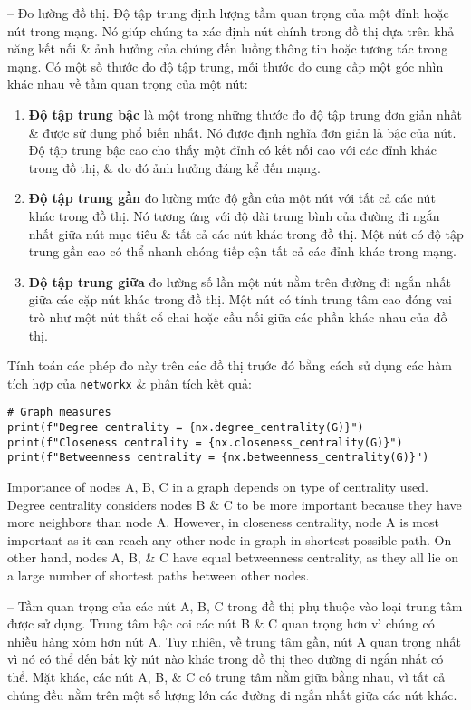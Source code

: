 \documentclass{article}
\begin{document}
\begin{itemize}
\begin{itemize}
\begin{itemize}
            -- {\sf Đo lường đồ thị.} Độ tập trung định lượng tầm quan trọng của một đỉnh hoặc nút trong mạng. Nó giúp chúng ta xác định nút chính trong đồ thị dựa trên khả năng kết nối \& ảnh hưởng của chúng đến luồng thông tin hoặc tương tác trong mạng. Có một số thước đo độ tập trung, mỗi thước đo cung cấp một góc nhìn khác nhau về tầm quan trọng của một nút:
            \begin{enumerate}
                \item {\bf Độ tập trung bậc} là một trong những thước đo độ tập trung đơn giản nhất \& được sử dụng phổ biến nhất. Nó được định nghĩa đơn giản là bậc của nút. Độ tập trung bậc cao cho thấy một đỉnh có kết nối cao với các đỉnh khác trong đồ thị, \& do đó ảnh hưởng đáng kể đến mạng.
                \item {\bf Độ tập trung gần} đo lường mức độ gần của một nút với tất cả các nút khác trong đồ thị. Nó tương ứng với độ dài trung bình của đường đi ngắn nhất giữa nút mục tiêu \& tất cả các nút khác trong đồ thị. Một nút có độ tập trung gần cao có thể nhanh chóng tiếp cận tất cả các đỉnh khác trong mạng.
                \item {\bf Độ tập trung giữa} đo lường số lần một nút nằm trên đường đi ngắn nhất giữa các cặp nút khác trong đồ thị. Một nút có tính trung tâm cao đóng vai trò như một nút thắt cổ chai hoặc cầu nối giữa các phần khác nhau của đồ thị.
            \end{enumerate}
            Tính toán các phép đo này trên các đồ thị trước đó bằng cách sử dụng các hàm tích hợp của {\tt networkx} \& phân tích kết quả:
            \begin{verbatim}
# Graph measures
print(f"Degree centrality = {nx.degree_centrality(G)}")
print(f"Closeness centrality = {nx.closeness_centrality(G)}")
print(f"Betweenness centrality = {nx.betweenness_centrality(G)}")
            \end{verbatim}
            Importance of nodes A, B, C in a graph depends on type of centrality used. Degree centrality considers nodes B \& C to be more important because they have more neighbors than node A. However, in closeness centrality, node A is most important as it can reach any other node in graph in shortest possible path. On other hand, nodes A, B, \& C have equal betweenness centrality, as they all lie on a large number of shortest paths between other nodes.

            -- Tầm quan trọng của các nút A, B, C trong đồ thị phụ thuộc vào loại trung tâm được sử dụng. Trung tâm bậc coi các nút B \& C quan trọng hơn vì chúng có nhiều hàng xóm hơn nút A. Tuy nhiên, về trung tâm gần, nút A quan trọng nhất vì nó có thể đến bất kỳ nút nào khác trong đồ thị theo đường đi ngắn nhất có thể. Mặt khác, các nút A, B, \& C có trung tâm nằm giữa bằng nhau, vì tất cả chúng đều nằm trên một số lượng lớn các đường đi ngắn nhất giữa các nút khác.


\end{itemize}
\end{itemize}
\end{itemize}
\end{document}
